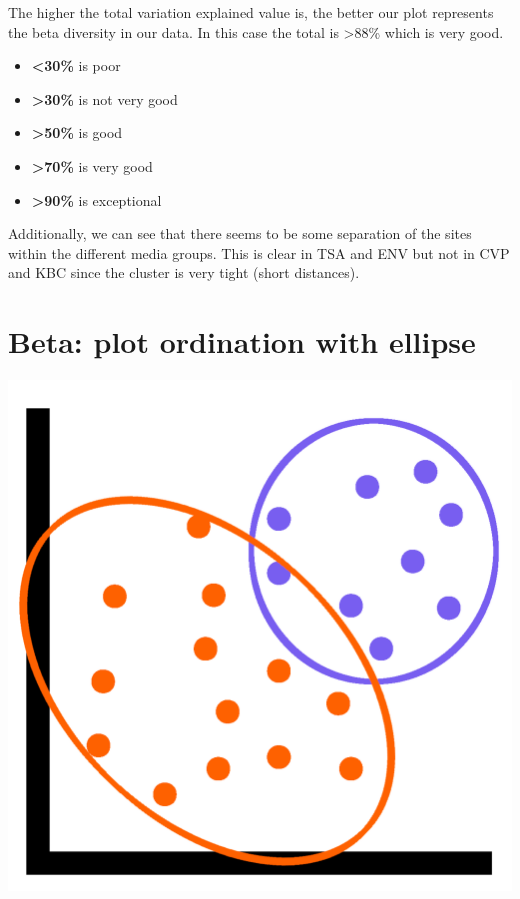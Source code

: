 \documentclass[
]{book}
\providecommand{\tightlist}{%
  \setlength{\itemsep}{0pt}\setlength{\parskip}{0pt}}
\begin{document}
The higher the total variation explained value is, the better our plot represents the beta diversity in our data.
In this case the total is \textgreater88\% which is very good.

\begin{itemize}
\tightlist
\item
  \textbf{\textless30\%} is poor
\item
  \textbf{\textgreater30\%} is not very good
\item
  \textbf{\textgreater50\%} is good
\item
  \textbf{\textgreater70\%} is very good
\item
  \textbf{\textgreater90\%} is exceptional
\end{itemize}

Additionally, we can see that there seems to be some separation of the sites within the different media groups. This is clear in TSA and ENV but not in CVP and KBC since the cluster is very tight (short distances).

\hypertarget{beta-plot-ordination-with-ellipse}{%
\section{Beta: plot ordination with ellipse}\label{beta-plot-ordination-with-ellipse}}

\includegraphics{figures/elippses_plot.png}
\end{document}
